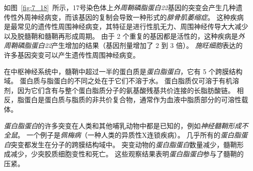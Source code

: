 \begin{proposition}[髓鞘蛋白缺陷破坏神经信号传导]
	\quad \quad 如图~\ref{fig:7_18}~所示，17号染色体上\textit{外周鞘磷脂蛋白22}基因的突变会产生几种遗传性外周神经病变，而该基因的复制会导致一种形式的\textit{腓骨肌萎缩症}。
	这种疾病是最常见的遗传性周围神经病变，其特征是进行性肌无力、周围神经传导大大减少以及脱髓鞘和髓鞘再形成周期。
	由于 2 个重复的基因都是活性的，这种疾病是\textit{外周鞘磷脂蛋白22}产生增加的结果（基因剂量增加了 2 到 3 倍）。
	\textit{施旺细胞}表达的许多基因突变可以产生遗传性周围神经病变。
	
	\quad \quad 在中枢神经系统中，髓鞘中超过一半的蛋白质是\textit{蛋白脂蛋白}，它有 5 个跨膜结构域。
	蛋白质与脂蛋白的不同之处在于它们不溶于水。
	蛋白脂质仅可溶于有机溶剂，因为它们含有与整个蛋白脂质分子的氨基酸残基共价连接的长脂肪酸链。
	相反，脂蛋白是蛋白质与脂质的非共价复合物，通常作为血液中脂质部分的可溶性载体。
	
	\quad \quad \textit{蛋白脂蛋白}的许多突变在人类和其他哺乳动物中都是已知的，例如\textit{神经髓鞘形成不全鼠}。
	一个例子是\textit{佩梅病}（一种人类的异质性X连锁疾病）。
	几乎所有的\textit{蛋白脂蛋白}突变都发生在分子的跨膜结构域中。
	突变动物的\textit{蛋白脂蛋白}数量减少，髓鞘形成减少，少突胶质细胞变性和死亡。
	这些观察结果表明\textit{蛋白脂蛋白}参与了髓鞘的压紧。
	
\end{proposition}


